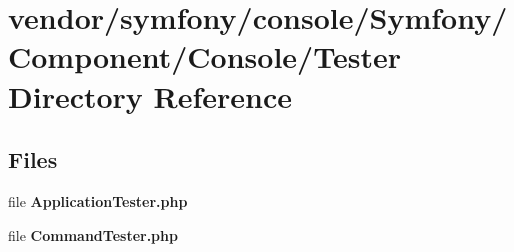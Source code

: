 \section{vendor/symfony/console/\+Symfony/\+Component/\+Console/\+Tester Directory Reference}
\label{dir_f0105f2f59d5c6c0c2fd703c10e578c0}
\subsection*{Files}
\begin{DoxyCompactItemize}
\item 
file {\bf Application\+Tester.\+php}
\item 
file {\bf Command\+Tester.\+php}
\end{DoxyCompactItemize}
